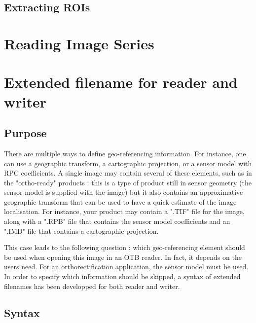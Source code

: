 \subsection{Extracting ROIs}
\label{sec:ExtractROI}



%

\section{Reading Image Series}
\label{sec:Reading Image Series}



\section{Extended filename for reader and writer}
\label{sec:Reading Image Series}

\subsection{Purpose}

There are multiple ways to define geo-referencing information. For instance,
 one can use a geographic transform, a cartographic projection, or a sensor 
model with RPC coefficients. A single image may contain several of these 
elements, such as in the "ortho-ready" products : this is a type of product 
still in sensor geometry (the sensor model is supplied with the image) 
but it also contains an approximative geographic transform that can be used 
to have a quick estimate of the image localisation. For instance, your product
may contain a ".TIF" file for the image, along with a ".RPB" file that contains
the sensor model coefficients and an ".IMD" file that contains a cartographic 
projection. 

This case leads to the following question : which geo-referencing element
should be used when opening this image in an OTB reader. In fact, it depends on
the users need. For an orthorectification application, the sensor model must be
used. In order to specify which information should be skipped, a syntax of 
extended filenames has been developped for both reader and writer. 


\subsection{Syntax}

